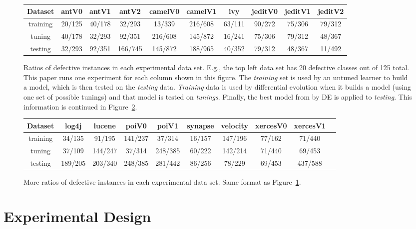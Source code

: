 \documentclass{sig-alternative}
\newcommand{\fig}[1]{Figure~\ref{fig:#1}}
\def\baselinestretch{1}
\begin{document}
\begin{figure}[!ht]

\renewcommand{\baselinestretch}{0.8}
\scriptsize
\centering
  \begin{tabular}{c c c c c c c c c c }\hline
  Dataset &antV0&antV1&antV2&camelV0&camelV1&ivy&jeditV0&jeditV1&jeditV2
\\\hline
  training &20/125 &40/178 &32/293 &13/339 &216/608 &63/111 &90/272 &75/306 &79/312
\\  tuning  &40/178 &32/293 &92/351 &216/608 &145/872 &16/241 &75/306 &79/312 &48/367
\\  testing &32/293 &92/351 &166/745 &145/872 &188/965 &40/352 &79/312 &48/367 &11/492
\\  \end{tabular}
   \caption{Ratios of defective instances in each experimental data set. 
   E.g., the top left data set has 20 defective classes out of 125 total.
   This paper runs one experiment for each column
   shown in this figure. The {\em training} set is used by an untuned learner
   to build a model, which is then tested on the {\em testing} data.
   {\em Training} data is used by  differential evolution when it builds
    a model (using one set of possible tunings) and that model is tested on {\em tunings}.
    Finally, the best model from by DE is applied to {\em testing}. 
   This information is continued  in \fig{data2}. 
   }\label{fig:data1}
\end{figure}
\begin{figure}[!ht]
\scriptsize
\centering
  \begin{tabular}{c c c c c c c c c c }
  \hline\hline
  Dataset &log4j&lucene&poiV0&poiV1&synapse&velocity&xercesV0&xercesV1
\\\hline
  training &34/135 &91/195 &141/237 &37/314 &16/157 &147/196 &77/162 &71/440
\\  tuning  &37/109 &144/247 &37/314 &248/385 &60/222 &142/214 &71/440 &69/453
\\  testing &189/205 &203/340 &248/385 &281/442 &86/256 &78/229 &69/453 &437/588
\\  \end{tabular}

   \caption{More ratios of  defective instances in each experimental data set. 
   Same format as \fig{data1}.}\label{fig:data2}
\end{figure}


\section{Experimental Design}
\end{document}
